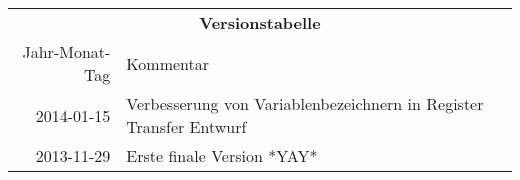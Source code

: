 \begin{table}[htp]
\centering
\begin{tabular}{rl}
\multicolumn{2}{c}{\textbf{Versionstabelle}} \\
Jahr-Monat-Tag & Kommentar \\ \hline
2014-01-15 & Verbesserung von Variablenbezeichnern in Register Transfer Entwurf \\
2013-11-29 & Erste finale Version *YAY* \\
\end{tabular}
\end{table}